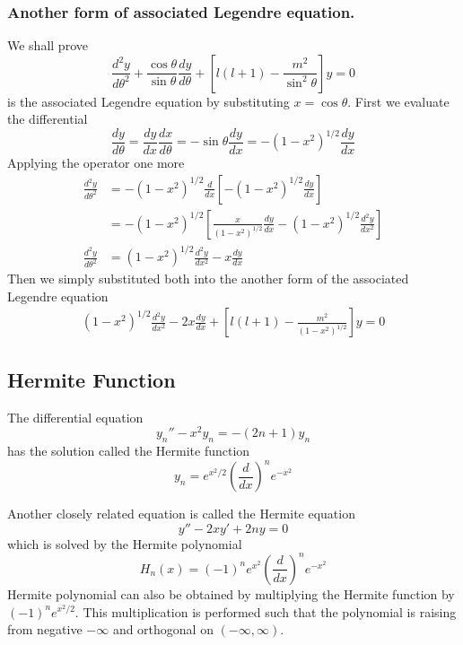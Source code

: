 \documentclass[../../../main.tex]{subfiles}
\begin{document}
\subsubsection{Another form of associated Legendre equation.} We shall prove
\begin{equation*}
    \frac{d^2y}{d\theta^2} +\frac{\cos \theta}{\sin\theta}\frac{dy}{d\theta} +\left[l(l+1)-\frac{m^2}{\sin^2\theta} \right]y =0
\end{equation*}
is the associated Legendre equation by substituting $x=\cos\theta$.
First we evaluate the differential
\begin{equation*}
    \frac{dy}{d\theta}=\frac{dy}{dx}\frac{dx}{d\theta}=-\sin\theta\frac{dy}{dx}=-(1-x^2)^{1/2}\frac{dy}{dx}
\end{equation*}
Applying the operator one more
\begin{align*}
    \frac{d^2y}{d\theta^2} & =-(1-x^2)^{1/2}\frac{d}{dx}\left[-(1-x^2)^{1/2}\frac{dy}{dx}\right]                              \\
                           & =-(1-x^2)^{1/2}\left[\frac{x}{(1-x^2)^{1/2}}\frac{dy}{dx} -(1-x^2)^{1/2}\frac{d^2y}{dx^2}\right] \\
    \frac{d^2y}{d\theta^2} & =(1-x^2)^{1/2}\frac{d^2y}{dx^2}-x\frac{dy}{dx}
\end{align*}
Then we simply substituted both into the another form of the associated Legendre equation
\begin{align*}
    (1-x^2)^{1/2}\frac{d^2y}{dx^2}-2x\frac{dy}{dx}+\left[l(l+1)-\frac{m^2}{(1-x^2)^{1/2}} \right]y=0
\end{align*}

\subsection{Hermite Function}
The diﬀerential equation
\begin{equation*}
    y_n''-x^2y_n=-(2n+1)y_n
\end{equation*}
has the solution called the Hermite function
\begin{equation*}
    y_n=e^{x^2/2}\left(\frac{d}{dx}\right)^ne^{-x^2}
\end{equation*}

Another closely related equation is called the Hermite equation
\begin{equation*}
    y''-2xy'+2ny=0
\end{equation*}
which is solved by the Hermite polynomial
\begin{equation*}
    H_n(x)=(-1)^ne^{x^2}\left(\frac{d}{dx}\right)^ne^{-x^2}
\end{equation*}
Hermite polynomial can also be obtained by multiplying the Hermite function by $(-1)^ne^{x^2/2}$.
This multiplication is performed such that the polynomial is raising from negative $-\infty$ and orthogonal on $(-\infty,\infty)$.
\end{document}
